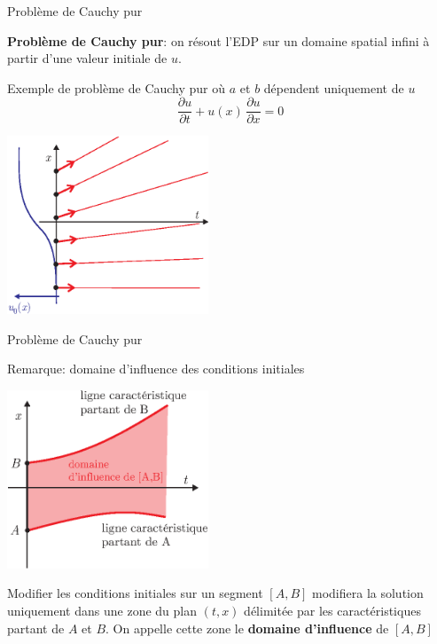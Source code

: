 \documentclass[
mode=present,    %
paper=a4paper,   %
orient=landscape,
display=slides,   %
size=10pt,
style=romain   %
]{powerdot}
\begin{document}
\begin{slide}[toc=Cauchy pur]{Problème de Cauchy pur}

\textbf{Problème de Cauchy pur}: on résout l'EDP sur un domaine spatial infini à partir d'une valeur initiale de $u$.

\bigskip

Exemple de problème de Cauchy pur où $a$ et $b$ dépendent uniquement de $u$
\begin{equation*}
\frac{\partial u}{\partial t} + u(x)\, \frac{\partial u}{\partial x} = 0
\end{equation*}
\bigskip

    \centerline{\includegraphics[width=0.45\textwidth]{cauchy1d.eps} }

\end{slide}


\begin{slide}[toc=]{Problème de Cauchy pur}

Remarque: domaine d'influence des conditions initiales

\bigskip

    \centerline{\includegraphics[width=0.45\textwidth]{dominfl1d.eps} }

Modifier les conditions initiales sur un segment $[A,B]$ modifiera la solution uniquement dans une zone du plan $(t,x)$ délimitée par les caractéristiques partant de $A$ et $B$. On appelle cette zone le \textbf{domaine d'influence} de $[A,B]$

\end{slide}
\end{document}
